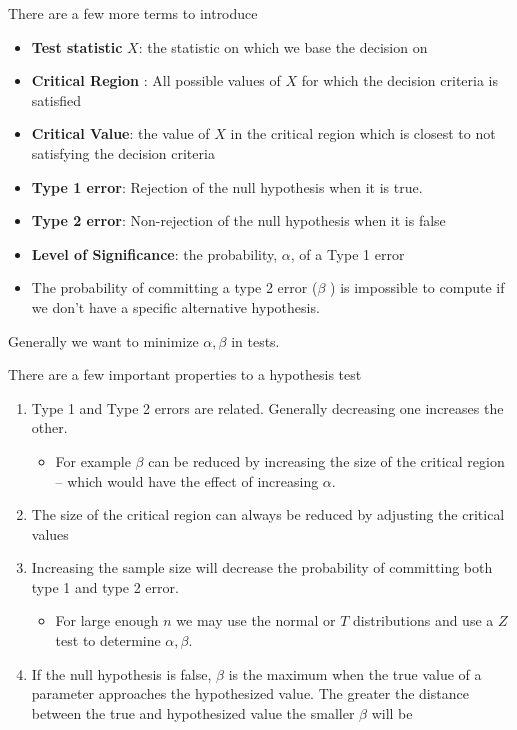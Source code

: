 \documentclass[10pt]{article}
\begin{document}
There are a few more terms to introduce

\begin{definition}
	\begin{itemize}
		\item \textbf{Test statistic} $ X $: the statistic on which we base the decision on
		\item \textbf{Critical Region} : All possible values of $ X $ for which the decision criteria is satisfied
		\item \textbf{Critical Value}: the value of $ X $ in the critical region which is closest to not satisfying the decision criteria
		\item \textbf{Type 1 error}: Rejection of the null hypothesis when it is true. 
		\item \textbf{Type 2 error}: Non-rejection of the null hypothesis when it is false
		\item \textbf{Level of Significance}: the probability, $ \alpha $, of a Type 1 error
		\item The probability of committing a type 2 error ($ \beta $ ) is impossible to compute if we don't have a specific alternative hypothesis. 
	\end{itemize}
\end{definition}

Generally we want to minimize $ \alpha, \beta $ in tests. 

There are a few important properties to a hypothesis test

\begin{enumerate}
	\item Type 1 and Type 2 errors are related. Generally decreasing one increases the other.
	\begin{itemize}
		\item For example $ \beta $ can be reduced by increasing the size of the critical region -- which would have the effect of increasing $ \alpha $. 
	\end{itemize}
\item The size of the critical region can always be reduced by adjusting the critical values
\item Increasing the sample size will decrease the probability of committing both type 1 and type 2 error.
	\begin{itemize}
		\item For large enough $ n $ we may use the normal or $ T $ distributions and use a $ Z $ test to determine $ \alpha, \beta $.
	\end{itemize}
\item If the null hypothesis is false, $ \beta $ is the maximum when the true value of a parameter approaches the hypothesized value. The greater the distance between the true and hypothesized value the smaller $ \beta $ will be
\end{enumerate}
\end{document}
